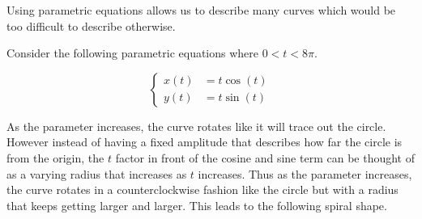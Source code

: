 \documentclass{ximera}
\begin{document}
Using parametric equations allows us to describe many curves which would be too difficult to describe otherwise.


\begin{example}
Consider the following parametric equations where $0 <t < 8\pi$.

\[
\begin{cases}
x(t)&=t\cos(t) \\
y(t)&=t\sin(t)
\end{cases}
\]

As the parameter increases, the curve rotates like it will trace out the circle. However instead of having a fixed amplitude that describes how far the circle is from the origin, the $t$ factor in front of the cosine and sine term can be thought of as a varying radius that increases as $t$ increases. Thus as the parameter increases, the curve rotates in a counterclockwise fashion like the circle but with a radius that keeps getting larger and larger. This leads to the following spiral shape.

\begin{image}
\end{image}

\end{example}
\end{document}
